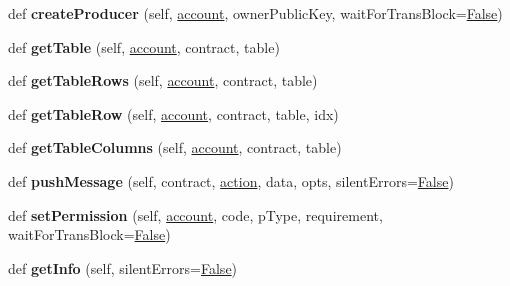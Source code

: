 \begin{DoxyCompactItemize}
\item 
\mbox{\label{classtest_utils_1_1_node_ad398c3c0bafaac3441451530aac6dc33}} 
def {\bfseries create\+Producer} (self, \mbox{\hyperlink{structaccount}{account}}, owner\+Public\+Key, wait\+For\+Trans\+Block=\mbox{\hyperlink{struct_false}{False}})
\item 
\mbox{\label{classtest_utils_1_1_node_adef7639e34e7bf8355a704d54da6a39a}} 
def {\bfseries get\+Table} (self, \mbox{\hyperlink{structaccount}{account}}, contract, table)
\item 
\mbox{\label{classtest_utils_1_1_node_ac2aa112507bf3d57b81c4c1d3199b7ef}} 
def {\bfseries get\+Table\+Rows} (self, \mbox{\hyperlink{structaccount}{account}}, contract, table)
\item 
\mbox{\label{classtest_utils_1_1_node_aa28a49b31554b49f34920b7ca6d89264}} 
def {\bfseries get\+Table\+Row} (self, \mbox{\hyperlink{structaccount}{account}}, contract, table, idx)
\item 
\mbox{\label{classtest_utils_1_1_node_aa5b54b1b9935b94c0a8cd399296b157d}} 
def {\bfseries get\+Table\+Columns} (self, \mbox{\hyperlink{structaccount}{account}}, contract, table)
\item 
\mbox{\label{classtest_utils_1_1_node_a1fc83517cbf96aad3aa96408b22c4689}} 
def {\bfseries push\+Message} (self, contract, \mbox{\hyperlink{structaction}{action}}, data, opts, silent\+Errors=\mbox{\hyperlink{struct_false}{False}})
\item 
\mbox{\label{classtest_utils_1_1_node_a67665b3a537bcedaa35ea598e854ff13}} 
def {\bfseries set\+Permission} (self, \mbox{\hyperlink{structaccount}{account}}, code, p\+Type, requirement, wait\+For\+Trans\+Block=\mbox{\hyperlink{struct_false}{False}})
\item 
\mbox{\label{classtest_utils_1_1_node_a0bb41abe4227a6e27353f1d629a8f344}} 
def {\bfseries get\+Info} (self, silent\+Errors=\mbox{\hyperlink{struct_false}{False}})
\item 
\mbox{\label{classtest_utils_1_1_node_a741d26e7ba002c7c21a0ff44f8b203b8}} 

\end{DoxyCompactItemize}
